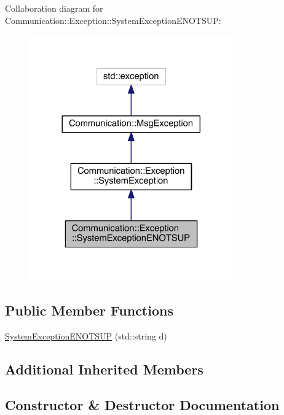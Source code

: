 Collaboration diagram for Communication\+:\+:Exception\+:\+:System\+Exception\+E\+N\+O\+T\+S\+U\+P\+:\nopagebreak
\begin{figure}[H]
\begin{center}
\leavevmode
\includegraphics[width=248pt]{class_communication_1_1_exception_1_1_system_exception_e_n_o_t_s_u_p__coll__graph}
\end{center}
\end{figure}
\subsection*{Public Member Functions}
\begin{DoxyCompactItemize}
\item 
\hyperlink{class_communication_1_1_exception_1_1_system_exception_e_n_o_t_s_u_p_ad3c7ba432438af2fc7438e866c4bc8d8}{System\+Exception\+E\+N\+O\+T\+S\+U\+P} (std\+::string d)
\end{DoxyCompactItemize}
\subsection*{Additional Inherited Members}


\subsection{Constructor \& Destructor Documentation}
\hypertarget{class_communication_1_1_exception_1_1_system_exception_e_n_o_t_s_u_p_ad3c7ba432438af2fc7438e866c4bc8d8}{}
